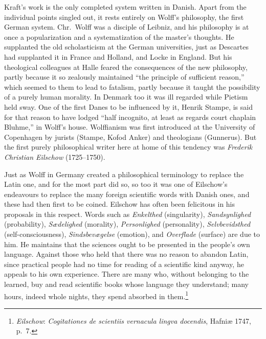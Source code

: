 \documentclass[12pt,a4paper]{book}
\newcommand{\opage}[1]{\marginnote{\footnotesize\textit{[#1]}}}
\begin{document}
Kraft's work is the only completed system written in Danish. Apart from the
individual points singled out, it rests entirely on Wolff's philosophy, the first
German system. Chr.\ Wolff was a disciple of Leibniz, and his philosophy is at
once a popularization and a systematization of the master's thoughts. He
supplanted the old scholasticism at the German universities, just as Descartes
had supplanted it in France and Holland, and Locke in England. But his
theological colleagues at Halle feared the consequences of the new philosophy,
partly because it so zealously maintained ``the principle of sufficient reason,''
which seemed to them to lead to fatalism, partly because it taught the
possibility of a purely human morality. In Denmark too it was ill regarded while
Pietism held sway. One of the first Danes to be influenced by it, Henrik Stampe,
is said for that reason to have lodged ``half \opage{21}incognito, at least as regards
court chaplain Bluhme,'' in Wolff's house. Wolffianism was first introduced at
the University of Copenhagen by jurists (Stampe, Kofod Anker) and theologians
(Gunnerus). But the first purely philosophical writer here at home of this
tendency was \emph{Frederik Christian Eilschow} (1725--1750).

Just as Wolff in Germany created a philosophical terminology to replace the Latin
one, and for the most part did so, so too it was one of Eilschow's endeavours to
replace the many foreign scientific words with Danish ones, and these had then
first to be coined. Eilschow has often been felicitous in his proposals in this
respect. Words such as \emph{Enkelthed} (singularity), \emph{Sandsynlighed}
(probability), \emph{Sædelighed} (morality), \emph{Personlighed} (personality),
\emph{Selvbevidsthed} (self-consciousness), \emph{Sindsbevægelse} (emotion), and
\emph{Overflade} (surface) are due to him. He maintains that the sciences ought
to be presented in the people's own language. Against those who held that there
was no reason to abandon Latin, since practical people had no time for reading of
a scientific kind anyway, he appeals to his own experience. There are many who,
without belonging to the learned, buy and read scientific books whose language
they understand; many hours, indeed whole nights, they spend absorbed in
them.\footnote{\emph{Eilschow}: \emph{Cogitationes de scientiis vernacula lingva
docendis}, Hafniæ 1747, p.~7.}
\end{document}
